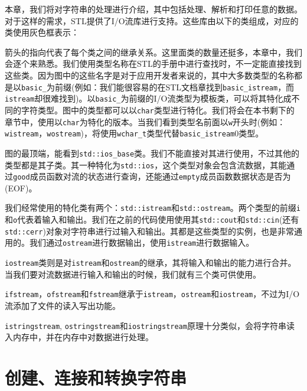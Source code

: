 本章，我们将对字符串的处理进行介绍，其中包括处理、解析和打印任意的数据。对于这样的需求，STL提供了I/O流库进行支持。这些库由以下的类组成，对应的类使用灰色框表示：


箭头的指向代表了每个类之间的继承关系。这里面类的数量还挺多，本章中，我们会逐个来熟悉。我们使用类型名称在STL的手册中进行查找时，不一定能直接找到这些类。因为图中的这些名字是对于应用开发者来说的，其中大多数类型的名称都是以\texttt{basic\_}为前缀(例如：我们能很容易的在STL文档章找到\texttt{basic\_istream}，而\texttt{istream}却很难找到)。以\texttt{basic\_}为前缀的I/O流类型为模板类，可以将其特化成不同的字符类型。图中的类型都可以以\texttt{char}类型进行特化。我们将会在本书剩下的章节中，使用以\texttt{char}为特化的版本。当我们看到类型名前面以\texttt{w}开头时(例如：\texttt{wistream}，\texttt{wostream})，将使用\texttt{wchar\_t}类型代替\texttt{basic\_istream}0类型。

图的最顶端，能看到\texttt{std::ios\_base}类。我们不能直接对其进行使用，不过其他的类型都是其子类。其一种特化为\texttt{std::ios}，这个类型对象会包含流数据，其能通过\texttt{good}成员函数对流的状态进行查询，还能通过\texttt{empty}成员函数数据状态是否为(EOF)。

我们经常使用的特化类有两个：\texttt{std::istream}和\texttt{std::ostream}。两个类型的前缀\texttt{i}和\texttt{o}代表着输入和输出。我们在之前的代码使用使用其\texttt{std::cout}和\texttt{std::cin}(还有\texttt{std::cerr})对象对字符串进行过输入和输出。其都是这些类型的实例，也是非常通用的。我们通过\texttt{ostream}进行数据输出，使用\texttt{istream}进行数据输入。

\texttt{iostream}类则是对\texttt{istream}和\texttt{ostream}的继承，其将输入和输出的能力进行合并。当我们要对流数据进行输入和输出的时候，我们就有三个类可供使用。

\texttt{ifstream}，\texttt{ofstream}和\texttt{fstream}继承于\texttt{istream}，\texttt{ostream}和\texttt{iostream}，不过为I/O流添加了文件的读入写出功能。

\texttt{istringstream}, \texttt{ostringstream}和\texttt{iostringstream}原理十分类似，会将字符串读入内存中，并在内存中对数据进行处理。


\section{创建、连接和转换字符串}

